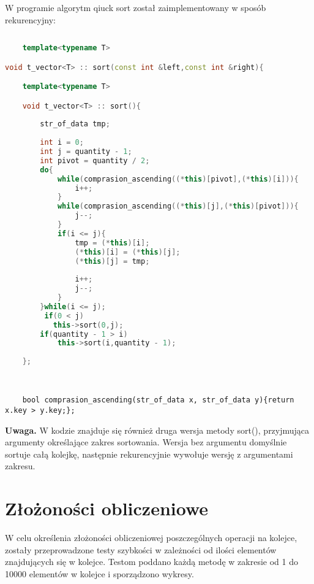 \documentclass[12pt]{article}
\begin{document}
W programie algorytm qiuck sort został zaimplementowany w sposób rekurencyjny:
\begin{lstlisting}[language = C++]
  
    template<typename T>

void t_vector<T> :: sort(const int &left,const int &right){

    template<typename T>

    void t_vector<T> :: sort(){
    
        str_of_data tmp;
    
        int i = 0;
        int j = quantity - 1;
        int pivot = quantity / 2;
        do{
            while(comprasion_ascending((*this)[pivot],(*this)[i])){
                i++;
            }
            while(comprasion_ascending((*this)[j],(*this)[pivot])){
                j--;
            }
            if(i <= j){
                tmp = (*this)[i];
                (*this)[i] = (*this)[j];
                (*this)[j] = tmp;
                
                i++;
                j--;
            }
        }while(i <= j);
         if(0 < j)
           this->sort(0,j);
        if(quantity - 1 > i)
            this->sort(i,quantity - 1);
    
    };
\end{lstlisting}

\begin{lstlisting}
    

    bool comprasion_ascending(str_of_data x, str_of_data y){return x.key > y.key;};

\end{lstlisting}

\textbf{Uwaga.} W kodzie znajduje się również druga wersja metody sort(), przyjmująca 
argumenty określające zakres sortowania. Wersja bez argumentu domyślnie sortuje całą kolejkę, następnie rekurencyjnie wywołuje 
wersję z argumentami zakresu.


\section{Złożoności obliczeniowe}

W celu określenia złożoności obliczeniowej poszczególnych operacji na kolejce, zostały przeprowadzone testy
szybkości w zależności od ilości elementów znajdujących się w kolejce. Testom poddano każdą metodę 
w zakresie od 1 do 10000 elementów w kolejce i sporządzono wykresy.
\end{document}
